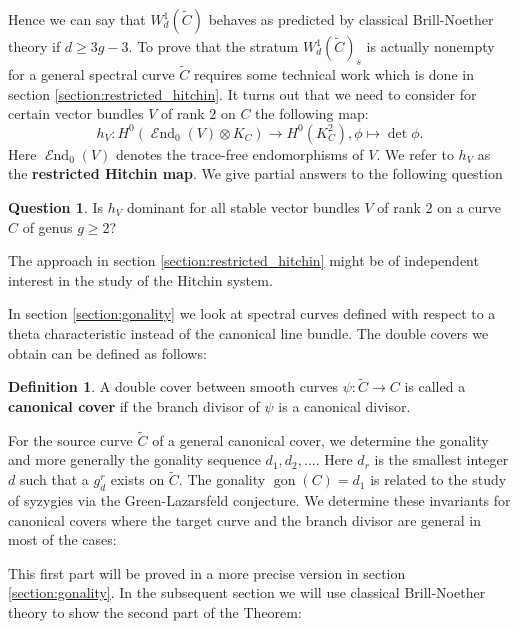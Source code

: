 \documentclass[12pt]{extarticle}
\theoremstyle{definition}
\newtheorem{definition}[theorem]{Definition}
\newtheorem{question}[theorem]{Question}
\numberwithin{theorem}{section}
\newcommand{\thistheoremname}{}
\newtheorem*{genericthm*}{\thistheoremname}
\newenvironment{namedthm*}[1]
{\renewcommand{\thistheoremname}{#1}%
	\begin{genericthm*}}
	{\end{genericthm*}}
\newcommand{\op}{\operatorname}
\DeclareMathOperator{\End}{\mathcal{E}nd}
\renewcommand{\tilde}{\widetilde}		%
\begin{document}
Hence we can say that $W^1_d(\tilde{C})$ behaves as predicted by classical Brill-Noether theory if $d \geq 3g-3$. 
To prove that the stratum $W^1_d(\tilde{C})_s$ is actually nonempty for a general spectral curve $\tilde{C}$ requires some technical work which is done in section \ref{section:restricted_hitchin}. It turns out that we need to consider for certain vector bundles $V$ of rank $2$ on $C$ the following map:
\begin{equation*}
h_V : H^0(\End_0(V)\otimes K_C) \to H^0(K_C^2), \phi \mapsto \det \phi.
\end{equation*}
Here $\End_0(V)$ denotes the trace-free endomorphisms of $V$. We refer to $h_V$ as the \textbf{restricted Hitchin map}. We give partial answers to the following question
\begin{question}
Is $h_V$ dominant for all stable vector bundles $V$ of rank $2$ on a curve $C$ of genus $g \geq 2$?
\end{question}
The approach in section \ref{section:restricted_hitchin} might be of independent interest in the study of the Hitchin system.

In section \ref{section:gonality} we look at spectral curves defined with respect to a theta characteristic instead of the canonical line bundle. The double covers we obtain can be defined as follows:
\begin{definition}
A double cover between smooth curves $\psi: \tilde{C} \rightarrow C$ is called a \textbf{canonical cover} if the branch divisor of $\psi$ is a canonical divisor. 
\end{definition}

For the source curve $\tilde{C}$ of a general canonical cover, we determine the gonality and more generally the gonality sequence $d_1,d_2,\ldots$. Here $d_r$ is the smallest integer $d$ such that a $g^r_d$ exists on $\tilde{C}$. The gonality $\op{gon}(C) = d_1$ is related to the study of syzygies via the Green-Lazarsfeld conjecture. We determine these invariants for canonical covers where the target curve and the branch divisor are general in most of the cases: 
This first part will be proved in a more precise version in section \ref{section:gonality}. In the subsequent section we will use classical Brill-Noether theory to show the second part of the Theorem:
\end{document}
